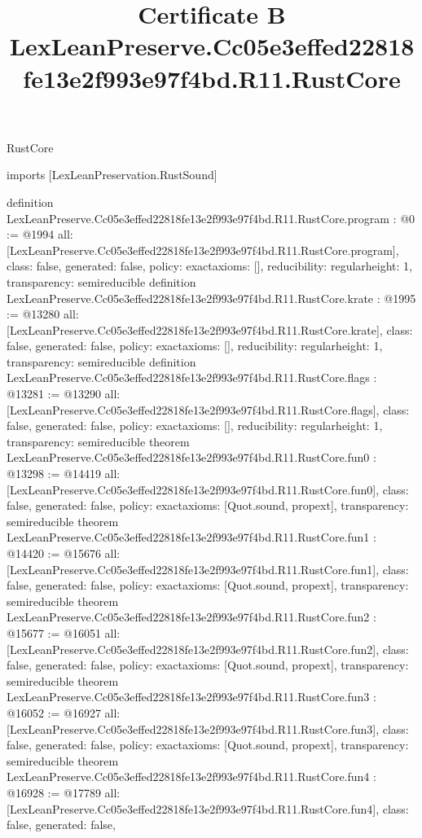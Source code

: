 \begin{lexlean}{RustCore}
\title{Certificate B LexLeanPreserve.Cc05e3effed22818fe13e2f993e97f4bd.R11.RustCore}
\begin{coremodule}
imports [LexLeanPreservation.RustSound]

definition LexLeanPreserve.Cc05e3effed22818fe13e2f993e97f4bd.R11.RustCore.program : @0 := @1994 {
  all: [LexLeanPreserve.Cc05e3effed22818fe13e2f993e97f4bd.R11.RustCore.program],
  class: false,
  generated: false,
  policy: exact{axioms: []},
  reducibility: regular{height: 1},
  transparency: semireducible
}
definition LexLeanPreserve.Cc05e3effed22818fe13e2f993e97f4bd.R11.RustCore.krate : @1995 := @13280 {
  all: [LexLeanPreserve.Cc05e3effed22818fe13e2f993e97f4bd.R11.RustCore.krate],
  class: false,
  generated: false,
  policy: exact{axioms: []},
  reducibility: regular{height: 1},
  transparency: semireducible
}
definition LexLeanPreserve.Cc05e3effed22818fe13e2f993e97f4bd.R11.RustCore.flags : @13281 := @13290 {
  all: [LexLeanPreserve.Cc05e3effed22818fe13e2f993e97f4bd.R11.RustCore.flags],
  class: false,
  generated: false,
  policy: exact{axioms: []},
  reducibility: regular{height: 1},
  transparency: semireducible
}
theorem LexLeanPreserve.Cc05e3effed22818fe13e2f993e97f4bd.R11.RustCore.fun0 : @13298 := @14419 {
  all: [LexLeanPreserve.Cc05e3effed22818fe13e2f993e97f4bd.R11.RustCore.fun0],
  class: false,
  generated: false,
  policy: exact{axioms: [Quot.sound, propext]},
  transparency: semireducible
}
theorem LexLeanPreserve.Cc05e3effed22818fe13e2f993e97f4bd.R11.RustCore.fun1 : @14420 := @15676 {
  all: [LexLeanPreserve.Cc05e3effed22818fe13e2f993e97f4bd.R11.RustCore.fun1],
  class: false,
  generated: false,
  policy: exact{axioms: [Quot.sound, propext]},
  transparency: semireducible
}
theorem LexLeanPreserve.Cc05e3effed22818fe13e2f993e97f4bd.R11.RustCore.fun2 : @15677 := @16051 {
  all: [LexLeanPreserve.Cc05e3effed22818fe13e2f993e97f4bd.R11.RustCore.fun2],
  class: false,
  generated: false,
  policy: exact{axioms: [Quot.sound, propext]},
  transparency: semireducible
}
theorem LexLeanPreserve.Cc05e3effed22818fe13e2f993e97f4bd.R11.RustCore.fun3 : @16052 := @16927 {
  all: [LexLeanPreserve.Cc05e3effed22818fe13e2f993e97f4bd.R11.RustCore.fun3],
  class: false,
  generated: false,
  policy: exact{axioms: [Quot.sound, propext]},
  transparency: semireducible
}
theorem LexLeanPreserve.Cc05e3effed22818fe13e2f993e97f4bd.R11.RustCore.fun4 : @16928 := @17789 {
  all: [LexLeanPreserve.Cc05e3effed22818fe13e2f993e97f4bd.R11.RustCore.fun4],
  class: false,
  generated: false,
}
\end{coremodule}
\end{lexlean}

